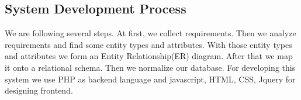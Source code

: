 \subsection{System Development Process}\label{subsec:sdp}
We  are following several steps. At first, we collect requirements. Then we
analyze requirements and find some entity types and attributes. With those
entity types and attributes we form an Entity Relationship(ER) diagram. After that we map it onto a relational schema. Then we normalize our database. For developing this system we use PHP as backend language and javascript, HTML, CSS, Jquery for designing frontend.
\begin{comment}


To design a database, one should follow the following steps:
\begin{enumerate}
\item Requirement analysis
	\begin{itemize}
		\item[-] interviewing, documentation, etc .
	\end{itemize}

\item Mapping onto a conceptual model (conceptual design)
     \begin{itemize}
     	\item[-] Entity Relationship(ER) model
     \end{itemize}
\item Mapping onto a data model (logical design)
	\begin{itemize}
     	\item[-] Relational model, object model etc. 
     \end{itemize}
\item Normalization
\item System Architecture
\item Realization and Implementation (physical design)    
    
\end{enumerate}
\end{comment}


